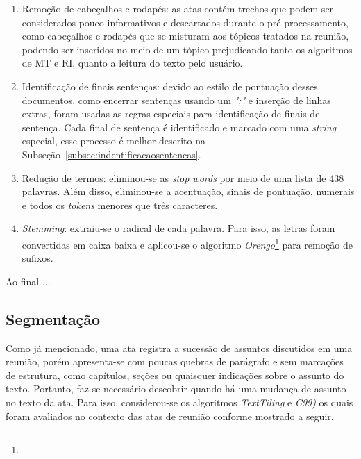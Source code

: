 \begin{enumerate}

\item Remoção de cabeçalhos e rodapés: as atas contém trechos que podem ser considerados pouco informativos e descartados durante o pré-processamento, como cabeçalhos e rodapés que se misturam aos tópicos tratados na reunião, podendo ser  inseridos no meio de um tópico prejudicando tanto os algoritmos de MT e RI, quanto a leitura do texto pelo usuário.

\item Identificação de finais sentenças: devido ao estilo de pontuação desses documentos, como encerrar sentenças usando um \textit{";"} e inserção de linhas extras, foram usadas as regras especiais para identificação de finais de sentença. Cada final de sentença é identificado e marcado com uma \textit{string} especial, esse processo é melhor descrito na Subseção~\ref{subsec:indentificacaosentencas}.



\item Redução de termos: eliminou-se as \textit{stop words} por meio de uma lista de 438 palavras. Além disso, eliminou-se a acentuação, sinais de pontuação, numerais e todos os \textit{tokens} menores que três caracteres. 

\item \textit{Stemming}: extraiu-se o radical de cada palavra. Para isso, as letras foram convertidas em caixa baixa e aplicou-se o algoritmo \textit{Orengo}\footnote{\urlorengo} para remoção de sufixos.

\end{enumerate}



Ao final ...


\subsection{Segmentação}


Como já mencionado, uma ata registra a sucessão de assuntos discutidos em uma reunião, porém apresenta-se com poucas quebras de parágrafo e sem marcações de estrutura, como capítulos, seções ou quaisquer indicações sobre o assunto do texto. Portanto, faz-se necessário descobrir quando há uma mudança de assunto no texto da ata. Para isso, considerou-se os algoritmos \textit{TextTiling} e \textit{C99)} os quais foram avaliados no contexto das atas de reunião conforme mostrado a seguir.

